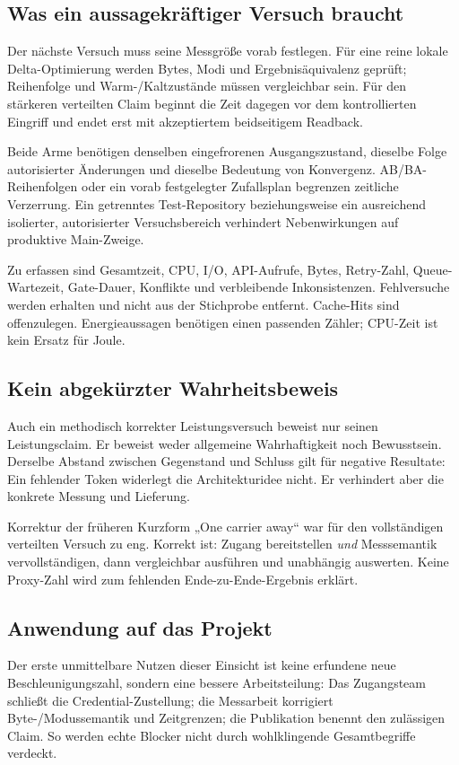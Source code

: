\begin{cols}
\subsection*{Was ein aussagekräftiger Versuch braucht}
Der nächste Versuch muss seine Messgröße vorab festlegen. Für eine reine lokale Delta-Optimierung werden Bytes, Modi und Ergebnisäquivalenz geprüft; Reihenfolge und Warm-/Kaltzustände müssen vergleichbar sein. Für den stärkeren verteilten Claim beginnt die Zeit dagegen vor dem kontrollierten Eingriff und endet erst mit akzeptiertem beidseitigem Readback.

Beide Arme benötigen denselben eingefrorenen Ausgangszustand, dieselbe Folge autorisierter Änderungen und dieselbe Bedeutung von Konvergenz. AB/BA-Reihenfolgen oder ein vorab festgelegter Zufallsplan begrenzen zeitliche Verzerrung. Ein getrenntes Test-Repository beziehungsweise ein ausreichend isolierter, autorisierter Versuchsbereich verhindert Nebenwirkungen auf produktive Main-Zweige.

Zu erfassen sind Gesamtzeit, CPU, I/O, API-Aufrufe, Bytes, Retry-Zahl, Queue-Wartezeit, Gate-Dauer, Konflikte und verbleibende Inkonsistenzen. Fehlversuche werden erhalten und nicht aus der Stichprobe entfernt. Cache-Hits sind offenzulegen. Energieaussagen benötigen einen passenden Zähler; CPU-Zeit ist kein Ersatz für Joule.

\subsection*{Kein abgekürzter Wahrheitsbeweis}
Auch ein methodisch korrekter Leistungsversuch beweist nur seinen Leistungsclaim. Er beweist weder allgemeine Wahrhaftigkeit noch Bewusstsein. Derselbe Abstand zwischen Gegenstand und Schluss gilt für negative Resultate: Ein fehlender Token widerlegt die Architekturidee nicht. Er verhindert aber die konkrete Messung und Lieferung.

\begin{boundary}{Korrektur der früheren Kurzform}
„One carrier away“ war für den vollständigen verteilten Versuch zu eng. Korrekt ist: Zugang bereitstellen \emph{und} Messsemantik vervollständigen, dann vergleichbar ausführen und unabhängig auswerten. Keine Proxy-Zahl wird zum fehlenden Ende-zu-Ende-Ergebnis erklärt.
\end{boundary}

\subsection*{Anwendung auf das Projekt}
Der erste unmittelbare Nutzen dieser Einsicht ist keine erfundene neue Beschleunigungszahl, sondern eine bessere Arbeitsteilung: Das Zugangsteam schließt die Credential-Zustellung; die Messarbeit korrigiert Byte-/Modussemantik und Zeitgrenzen; die Publikation benennt den zulässigen Claim. So werden echte Blocker nicht durch wohlklingende Gesamtbegriffe verdeckt.
\end{cols}

